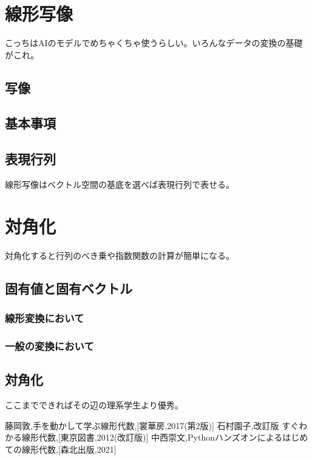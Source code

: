 \documentclass[10pt]{jsarticle}
\theoremstyle{definition}%
\numberwithin{equation}{section}%
\begin{document}
\section{線形写像}
こっちはAIのモデルでめちゃくちゃ使うらしい。いろんなデータの変換の基礎がこれ。
\subsection{写像}
\subsection{基本事項}
\subsection{表現行列}
線形写像はベクトル空間の基底を選べば表現行列で表せる。
\section{対角化}
対角化すると行列のべき乗や指数関数の計算が簡単になる。
\subsection{固有値と固有ベクトル}
\subsubsection{線形変換において}
\subsubsection{一般の変換において}
\subsection{対角化}
ここまでできればその辺の理系学生より優秀。
\begin{thebibliography}{99}
   藤岡敦,手を動かして学ぶ線形代数,[裳華房,2017(第2版)]
   石村園子,改訂版 すぐわかる線形代数,[東京図書,2012(改訂版)]
   中西崇文,Pythonハンズオンによるはじめての線形代数,[森北出版,2021]
\end{thebibliography}
\end{document}
